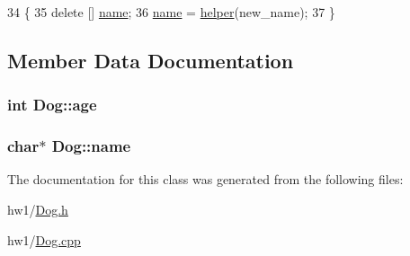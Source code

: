 \begin{DoxyCode}
34                                        \{
35   \textcolor{keyword}{delete} [] \hyperlink{classDog_a9f014dbeb42821cdb23f08eefa161c0a}{name};
36   \hyperlink{classDog_a9f014dbeb42821cdb23f08eefa161c0a}{name} = \hyperlink{classDog_ae88239590f01f57d6b01d338a0e48378}{helper}(new\_name);
37 \}
\end{DoxyCode}


\subsection{Member Data Documentation}
\hypertarget{classDog_a06f3f35c8fe0c80824156dcf9562b1cd}{}
\subsubsection[{age}]{\setlength{\rightskip}{0pt plus 5cm}int Dog\+::age\hspace{0.3cm}{\ttfamily [protected]}}\label{classDog_a06f3f35c8fe0c80824156dcf9562b1cd}
\hypertarget{classDog_a9f014dbeb42821cdb23f08eefa161c0a}{}
\subsubsection[{name}]{\setlength{\rightskip}{0pt plus 5cm}char$\ast$ Dog\+::name\hspace{0.3cm}{\ttfamily [protected]}}\label{classDog_a9f014dbeb42821cdb23f08eefa161c0a}


The documentation for this class was generated from the following files\+:\begin{DoxyCompactItemize}
\item 
hw1/\hyperlink{Dog_8h}{Dog.\+h}\item 
hw1/\hyperlink{Dog_8cpp}{Dog.\+cpp}\end{DoxyCompactItemize}
